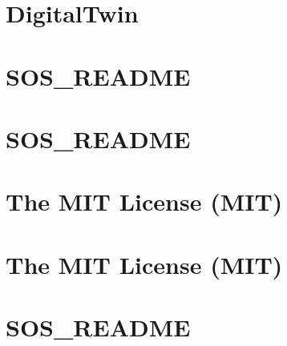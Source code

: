 \documentclass[twoside]{book}
\newcommand{\+}{\discretionary{\mbox{\scriptsize$\hookleftarrow$}}{}{}}
\begin{document}
\chapter{Digital\+Twin}
\label{md__d___source_shev4enkoyar__digital_twin__r_e_a_d_m_e}

\chapter{SOS\+\_\+\+README}
\label{md__d___source_shev4enkoyar__digital_twin__web_client_bin__debug_netcoreapp3_1_linux_x64__s_o_s__r_e_a_d_m_e}

\chapter{SOS\+\_\+\+README}
\label{md__d___source_shev4enkoyar__digital_twin__web_client_bin__publish__s_o_s__r_e_a_d_m_e}

\chapter{The MIT License (MIT)}
\label{md__d___source_shev4enkoyar__digital_twin__web_client_bin__publish_wwwroot__identity_lib_jquery_validation__l_i_c_e_n_s_e}

\chapter{The MIT License (MIT)}
\label{md__d___source_shev4enkoyar__digital_twin__web_client_bin__publish_wwwroot_lib_jquery_validation__l_i_c_e_n_s_e}

\chapter{SOS\+\_\+\+README}
\label{md__d___source_shev4enkoyar__digital_twin__web_client_bin__release_netcoreapp3_1_linux_x64__s_o_s__r_e_a_d_m_e}

\end{document}
